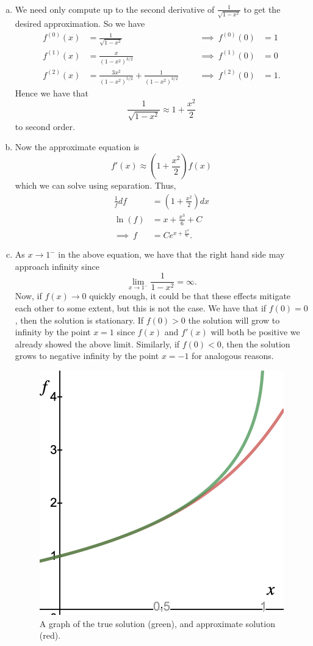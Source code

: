 \documentclass[12pt]{article} %
\begin{document}
\begin{solution}~
\begin{enumerate}[(a)]
    \item We need only compute up to the second derivative of $\frac{1}{\sqrt{1-x^2}}$ to get the desired approximation.  So we have
    \begin{align*}
        f^{(0)}(x)&= \frac{1}{\sqrt{1-x^2}} &&& \implies ~f^{(0)}(0)&=1\\
        f^{(1)}(x)&= \frac{x}{\left(1-x^2\right)^{3/2}} &&& \implies~ f^{(1)}(0)&=0\\
        f^{(2)}(x)&= \frac{3x^2}{\left(1-x^2\right)^{5/2}} + \frac{1}{\left(1-x^2\right)^{3/2}} &&& \implies ~f^{(2)}(0)&=1.
    \end{align*}
    Hence we have that
    \[
    \frac{1}{\sqrt{1-x^2}} \approx 1+\frac{x^2}{2}
    \]
    to second order.
    \item Now the approximate equation is
    \[
    f'(x)\approx \left(1+\frac{x^2}{2}\right)f(x)
    \]
    which we can solve using separation.  Thus,
    \begin{align*}
        \frac{1}{f}df&=\left(1+\frac{x^2}{2}\right)dx\\
        \ln(f)&= x+\frac{x^3}{6}+C\\
        \implies ~ f&= Ce^{x+\frac{x^3}{6}}.
    \end{align*}
    \item As $x\to 1^-$ in the above equation, we have that the right hand side may approach infinity since 
    \[
    \lim_{x\to 1^-} \frac{1}{1-x^2}=\infty.
    \]
    Now, if $f(x)\to 0$ quickly enough, it could be that these effects mitigate each other to some extent, but this is not the case.  We have that if $f(0)=0$, then the solution is stationary. If $f(0)>0$ the solution will grow to infinity by the point $x=1$ since $f(x)$ and $f'(x)$ will both be positive we already showed the above limit.  Similarly, if $f(0)<0$, then the solution grows to negative infinity by the point $x=-1$ for analogous reasons.  
    \begin{figure}[H]
        \centering
        \includegraphics[width=.5\textwidth]{Homework_6/desmos-graph.png}
        \caption{A graph of the true solution (green), and approximate solution (red).}
    \end{figure}
    \end{enumerate}
\end{solution}
\end{document}
